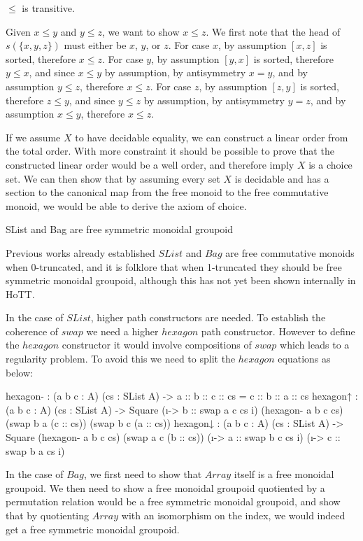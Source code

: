 \documentclass{article}
\newenvironment{code}{\verbatim}{\endverbatim}
\begin{document}
\begin{mythm}
    $\leq$ is transitive.
\end{mythm}
Given $x \leq y$ and $y \leq z$, we want to show $x \leq z$. We first note that the head of $s(\{x,y,z\})$
must either be $x$, $y$, or $z$.
For case $x$, by assumption $[x, z]$ is sorted, therefore $x \leq z$.
For case $y$, by assumption $[y, x]$ is sorted, therefore $y \leq x$, and since $x \leq y$ by assumption,
by antisymmetry $x = y$, and by assumption $y \leq z$, therefore $x \leq z$.
For case $z$, by assumption $[z, y]$ is sorted, therefore $z \leq y$, and since $y \leq z$ by assumption,
by antisymmetry $y = z$, and by assumption $x \leq y$, therefore $x \leq z$.

If we assume $X$ to have decidable equality, we can construct a linear order from the total order.
With more constraint it should be possible to prove that the constructed linear order would be a well order, and therefore imply $X$ is a choice
set. We can then show that by assuming every set $X$ is decidable and has a section to the canonical map from the free monoid to the free commutative monoid, we
would be able to derive the axiom of choice.

\begin{myconj}
    SList and Bag are free symmetric monoidal groupoid
\end{myconj}
Previous works already established $SList$ and $Bag$ are free commutative
monoids when 0-truncated, and it is folklore that when 1-truncated they should be free symmetric monoidal groupoid, although
this has not yet been shown internally in HoTT.

In the case of $SList$, higher path constructors are needed. To establish the coherence of $swap$ we need a higher $hexagon$
path constructor. However to define the $hexagon$ constructor it would involve compositions of $swap$ which leads to a regularity
problem. To avoid this we need to split the $hexagon$ equations as below:

\begin{code}
    hexagon- : (a b c : A) (cs : SList A)
    -> a :: b :: c :: cs = c :: b :: a :: cs
    hexagon↑ : (a b c : A) (cs : SList A)
    -> Square (\i -> b :: swap a c cs i) (hexagon- a b c cs)
    (swap b a (c :: cs)) (swap b c (a :: cs))
    hexagon↓ : (a b c : A) (cs : SList A)
    -> Square (hexagon- a b c cs) (swap a c (b :: cs))
    (\i -> a :: swap b c cs i) (\i -> c :: swap b a cs i)
\end{code}


In the case of $Bag$, we first need to show that $Array$ itself is a free monoidal groupoid. We then need to show a free
monoidal groupoid quotiented by a permutation relation would be a free symmetric monoidal groupoid, and show that by quotienting
$Array$ with an isomorphism on the index, we would indeed get a free symmetric monoidal groupoid.

\printbibliography
\end{document}
